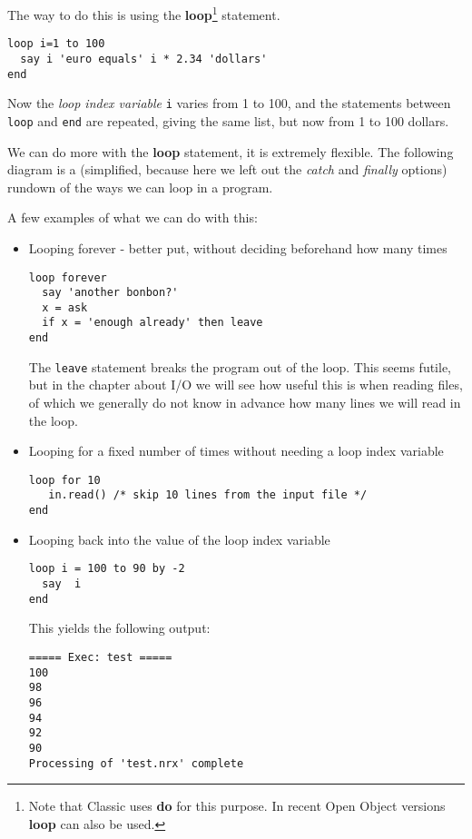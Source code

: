 {The way to do this is using the \textbf{loop}\footnote{Note that
  Classic \Rexx{} uses \textbf{do} for this purpose. In recent Open
  Object \Rexx{} versions
  \textbf{loop} can also be used.} statement.
\begin{lstlisting}[label=withoop,caption=With a loop]
loop i=1 to 100
  say i 'euro equals' i * 2.34 'dollars'
end
\end{lstlisting}
Now the \emph{loop index variable} \texttt{i} varies from 1 to 100,
and the statements between \texttt{loop} and \texttt{end} are
repeated, giving the same list, but now from 1 to 100 dollars.

We can do more with the \textbf{loop} statement, it is extremely
flexible. The following diagram is a (simplified, because here we left
out the \emph{catch} and \emph{finally} options) rundown of the ways
we can loop in a program.


A few examples of what we can do with this: 
\begin{itemize}
\item Looping forever - better put, without deciding beforehand how
  many times
\begin{lstlisting}[label=loopforever,caption=Loop Forever]
loop forever
  say 'another bonbon?'
  x = ask
  if x = 'enough already' then leave
end
\end{lstlisting}
The \texttt{leave} statement breaks the program out of the loop. This
seems futile, but in the chapter about I/O we will see how useful this
is when reading files, of which we generally do not know in advance
how many lines we will read in the loop.

\item Looping for a fixed number of times without needing a loop index
  variable
\begin{lstlisting}[label=loopfixed,caption=Loop for a fixed number of
  times without loop index variable]
loop for 10
   in.read() /* skip 10 lines from the input file */
end
\end{lstlisting}
\item Looping back into the value of the loop index variable
\begin{lstlisting}[label=loopforever,caption=Loop Forever]
loop i = 100 to 90 by -2
  say  i
end
\end{lstlisting}
This yields the following output:
\begin{verbatim}
===== Exec: test =====
100
98
96
94
92
90
Processing of 'test.nrx' complete
\end{verbatim}
\end{itemize}

}
